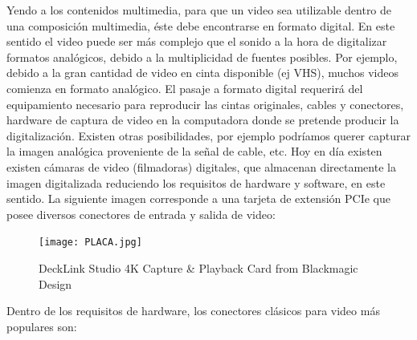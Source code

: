 \documentclass[12pt]{article}
\begin{document}
Yendo a los contenidos multimedia, para que un video sea utilizable dentro de 
una composición multimedia, éste debe encontrarse en formato digital. En este 
sentido el video puede ser más complejo que el sonido a la hora de digitalizar
formatos analógicos, debido a la multiplicidad de fuentes posibles. Por ejemplo, 
debido a la gran cantidad de video en cinta disponible (ej VHS), muchos videos 
comienza en formato analógico. El pasaje a formato digital requerirá del 
equipamiento necesario para reproducir las cintas originales, cables y conectores, 
hardware de captura de video en la computadora donde se pretende producir la 
digitalización. Existen otras posibilidades, por ejemplo podríamos querer 
capturar la imagen analógica proveniente de la señal de cable, etc. Hoy en día 
existen existen cámaras de video (filmadoras) digitales, que almacenan directamente
la imagen digitalizada reduciendo los requisitos de hardware y software, en este
sentido. La siguiente imagen corresponde a una tarjeta de extensión PCIe que posee
diversos conectores de entrada y salida de video: 


\begin{figure}[h]
\centering
\texttt{[image: PLACA.jpg]}
\renewcommand{\figurename}{Fig.}
\caption{DeckLink Studio 4K Capture \& Playback Card from Blackmagic Design}
\label{contexto:figura}
\end{figure}

Dentro de los requisitos de hardware, los conectores clásicos para video más 
populares son:
\end{document}
